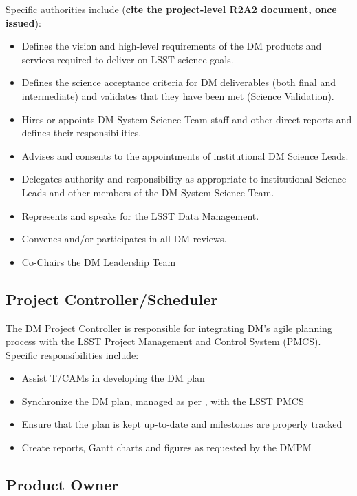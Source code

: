 Specific authorities include ({\bf cite the project-level R2A2 document, once issued}):

\begin{itemize}
\item Defines the vision and high-level requirements of the DM products and services required to deliver on LSST science goals.
\item Defines the science acceptance criteria for DM deliverables (both final and intermediate) and validates that they have been met (Science Validation).
\item Hires or appoints DM System Science Team staff and other direct reports and defines their responsibilities.
\item Advises and consents to the appointments of institutional DM Science Leads.
\item Delegates authority and responsibility as appropriate to institutional Science Leads and other members of the DM System Science Team.
\item Represents and speaks for the LSST Data Management.
\item Convenes and/or participates in all DM reviews.
\item Co-Chairs the DM Leadership Team
\end{itemize}

\subsection{Project Controller/Scheduler \label{role:pcon}}

The DM Project Controller is responsible for integrating DM's agile planning process with the LSST Project Management and Control System (PMCS). Specific responsibilities include:

\begin{itemize}

  \item{Assist T/CAMs in developing the DM plan}
  \item{Synchronize the DM plan, managed as per , with the LSST PMCS}
  \item{Ensure that the plan is kept up-to-date and milestones are properly tracked}
  \item{Create reports, Gantt charts and figures as requested by the DMPM}

\end{itemize}

\subsection{Product Owner \label{role:prodo}}


